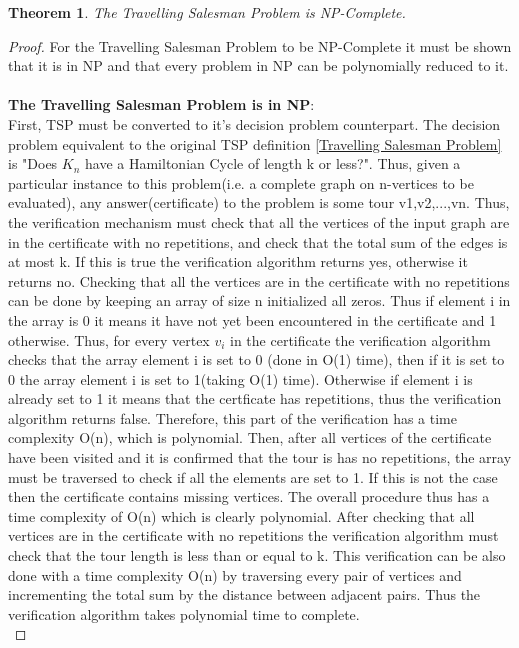 \documentclass{article}
\newtheorem{theorem}{Theorem}[subsection]
\begin{document}
\begin{theorem}
\label{TSP is NPC}
The Travelling Salesman Problem is NP-Complete.
\end{theorem}
\begin{proof}
For the Travelling Salesman Problem to be NP-Complete it must be shown that it is in NP and that every problem in NP can be polynomially reduced to it.\\
\\
\textbf{The Travelling Salesman Problem is in NP}:\\
First, TSP must be converted to it's decision problem counterpart. The decision problem equivalent to the original TSP definition \ref{Travelling Salesman Problem} is "Does $K_n$ have a Hamiltonian Cycle of length k or less?". Thus, given a particular instance to this problem(i.e. a complete graph on n-vertices to be evaluated), any answer(certificate) to the problem is some tour v1,v2,...,vn. Thus, the verification mechanism must check that all the vertices of the input graph are in the certificate with no repetitions, and check that the total sum of the edges is at most k. If this is true the verification algorithm returns yes, otherwise it returns no. Checking that all the vertices are in the certificate with no repetitions can be done by keeping an array of size n initialized all zeros. Thus if element i in the array is 0 it means it have not yet been encountered in the certificate and 1 otherwise. Thus, for every vertex $v_i$ in the certificate the verification algorithm checks that the array element i is set to 0 (done in O(1) time), then if it is set to 0 the array element i is set to 1(taking O(1) time). Otherwise if element i is already set to 1 it means that the certficate has repetitions, thus the verification algorithm returns false. Therefore, this part of the verification has a time complexity O(n), which is polynomial. Then, after all vertices of the certificate have been visited and it is confirmed that the tour is has no repetitions, the array must be traversed to check if all the elements are set to 1. If this is not the case then the certificate contains missing vertices. The overall procedure thus has a time complexity of O(n) which is clearly polynomial. After checking that all vertices are in the certificate with no repetitions the verification algorithm must check that the tour length is less than or equal to k. This verification can be also done with a time complexity O(n) by traversing every pair of vertices and incrementing the total sum by the distance between adjacent pairs. Thus the verification algorithm takes polynomial time to complete.\\

\end{proof}
\end{document}
